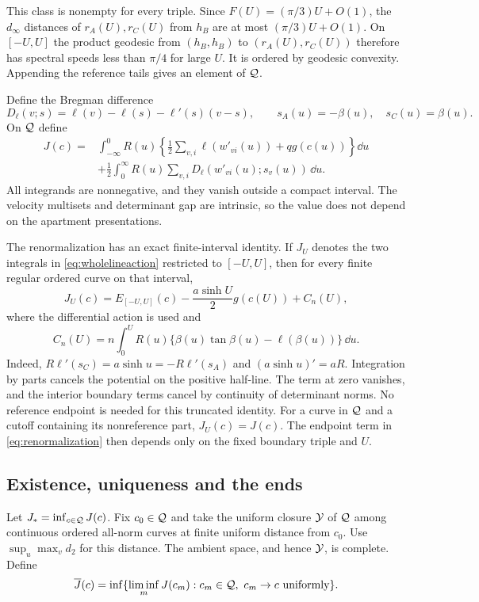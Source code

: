 This class is nonempty for every triple. Since
$F(U)=(\pi/3)U+O(1)$, the $d_\infty$ distances of $r_A(U),r_C(U)$
from $h_B$ are at most $(\pi/3)U+O(1)$. On $[-U,U]$ the product
geodesic from $(h_B,h_B)$ to $(r_A(U),r_C(U))$ therefore has spectral
speeds less than $\pi/4$ for large $U$. It is ordered by geodesic
convexity. Appending the reference tails gives an element of $\mathcal Q$.

Define the Bregman difference
\[
 D_\ell(v;s)=\ell(v)-\ell(s)-\ell'(s)(v-s),
 \qquad s_A(u)=-\beta(u),\quad s_C(u)=\beta(u).
\]
On $\mathcal Q$ define
\begin{equation}\label{eq:wholelineaction}
 \begin{split}
 J(c)={}&\int_{-\infty}^0 R(u)
   \left\{\frac12\sum_{v,i}\ell(w'_{vi}(u))+qg(c(u))\right\}\dd u\\
 &+\frac12\int_0^\infty R(u)
           \sum_{v,i}D_\ell(w'_{vi}(u);s_v(u))\,\dd u.
 \end{split}
\end{equation}
All integrands are nonnegative, and they vanish outside a compact
interval. The velocity multisets and determinant gap are intrinsic,
so the value does not depend on the apartment presentations.

The renormalization has an exact finite-interval identity. If $J_U$
denotes the two integrals in \eqref{eq:wholelineaction} restricted to
$[-U,U]$, then for every finite regular ordered curve on that interval,
\begin{equation}\label{eq:renormalization}
 J_U(c)=E_{[-U,U]}(c)-\frac{a\sinh U}{2}g(c(U))+C_n(U),
\end{equation}
where the differential action is used and
\[
 C_n(U)=n\int_0^U R(u)
                \{\beta(u)\tan\beta(u)-\ell(\beta(u))\}\,\dd u.
\]
Indeed, $R\ell'(s_C)=a\sinh u=-R\ell'(s_A)$ and
$(a\sinh u)'=aR$. Integration by parts cancels the potential on the
positive half-line. The term at zero vanishes, and the interior
boundary terms cancel by continuity of determinant norms.
No reference endpoint is needed for this truncated identity.
For a curve in $\mathcal Q$ and a cutoff containing its nonreference part,
$J_U(c)=J(c)$. The endpoint term in \eqref{eq:renormalization} then
depends only on the fixed boundary triple and $U$.

\subsection{Existence, uniqueness and the ends}
Let $J_* =\inf_{c\in\mathcal Q}J(c)$. Fix $c_0\in\mathcal Q$ and take the
uniform closure $\mathcal Y$ of $\mathcal Q$ among continuous ordered all-norm
curves at finite uniform distance from $c_0$. Use
$\sup_u\max_v d_2$ for this distance. The ambient space, and hence
$\mathcal Y$, is complete. Define
\begin{equation}\label{eq:globalrelaxation}
 \overline J(c)=\inf\{\liminf_m J(c_m):c_m\in\mathcal Q,
                                  \ c_m\to c\text{ uniformly}\}.
\end{equation}

